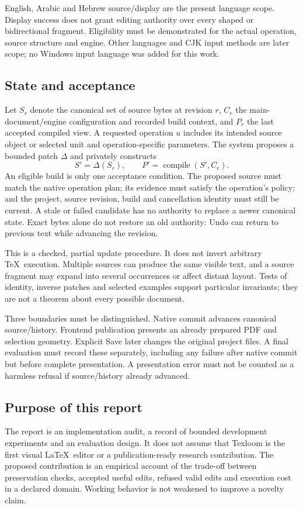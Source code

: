 English, Arabic and Hebrew source/display are the present language scope.
Display success does not grant editing authority over every shaped or
bidirectional fragment. Eligibility must be demonstrated for the actual
operation, source structure and engine. Other languages and CJK input methods
are later scope; no Windows input language was added for this work.

\subsection{State and acceptance}
Let $S_r$ denote the canonical set of source bytes at revision $r$, $C_r$ the
main-document/engine configuration and recorded build context, and $P_r$ the
last accepted compiled view. A requested operation $u$ includes its intended
source object or selected unit and operation-specific parameters. The system
proposes a bounded patch $\Delta$ and privately constructs
\[
S'=\Delta(S_r), \qquad P'=\operatorname{compile}(S',C_r).
\]
An eligible build is only one acceptance condition. The proposed source must
match the native operation plan; its evidence must satisfy the operation's
policy; and the project, source revision, build and cancellation identity must
still be current. A stale or failed candidate has no authority to replace a
newer canonical state. Exact bytes alone do not restore an old authority:
Undo can return to previous text while advancing the revision.

This is a checked, partial update procedure. It does not invert arbitrary
\TeX\ execution. Multiple sources can produce the same visible text, and a
source fragment may expand into several occurrences or affect distant layout.
Tests of identity, inverse patches and selected examples support particular
invariants; they are not a theorem about every possible document.

Three boundaries must be distinguished. Native commit advances canonical
source/history. Frontend publication presents an already prepared PDF and
selection geometry. Explicit Save later changes the original project files.
A final evaluation must record these separately, including any failure after
native commit but before complete presentation. A presentation error must not
be counted as a harmless refusal if source/history already advanced.

\subsection{Purpose of this report}
The report is an implementation audit, a record of bounded development
experiments and an evaluation design. It does not assume that Texloom is the
first visual \LaTeX\ editor or a publication-ready research contribution.
The proposed contribution is an empirical account of the trade-off between
preservation checks, accepted useful edits, refused valid edits and execution
cost in a declared domain. Working behavior is not weakened to improve a
novelty claim.
